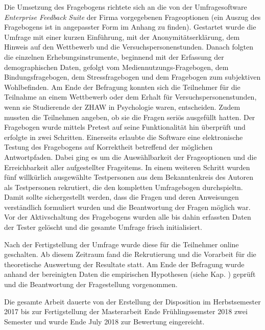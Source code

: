 Die Umsetzung des Fragebogens richtete sich an die von der Umfragesoftware \textit{Enterprise Feedback Suite} der Firma  vorgegebenen Frageoptionen (ein Auszug des Fragebogens ist in angepasster Form im Anhang  zu finden). Gestartet wurde die Umfrage mit einer kurzen Einführung, mit der Anonymitätserklärung, dem Hinweis auf den Wettbewerb und die Versuchspersonenstunden. Danach folgten die einzelnen Erhebungsinstrumente, beginnend mit der Erfassung der demographischen Daten, gefolgt vom Mediennutzungs-Fragebogen, dem Bindungsfragebogen, dem Stressfragebogen und dem Fragebogen zum subjektiven Wohlbefinden. Am Ende der Befragung konnten sich die Teilnehmer für die Teilnahme an einem Wettbewerb oder dem Erhalt für Versuchspersonenstunden, wenn sie Studierende der ZHAW in Psychologie waren, entscheiden. Zudem mussten die Teilnehmen angeben, ob sie die Fragen seriös ausgefüllt hatten. Der Fragebogen wurde mittels Pretest auf seine Funktionalität hin überprüft und erfolgte in zwei Schritten. Einerseits erlaubte die Software eine elektronische Testung des Fragebogens auf Korrektheit betreffend der möglichen Antwortpfaden. Dabei ging es um die Auswählbarkeit der Frageoptionen und die Erreichbarkeit aller aufgestellter Frageitems. In einem weiteren Schritt wurden fünf willkürlich ausgewählte Testpersonen aus dem Bekanntenkreis des Autoren als Testpersonen rekrutiert, die den kompletten Umfragebogen durchspieltn. Damit sollte sichergestellt werden, dass die Fragen und deren Anweisungen verständlich formuliert wurden und die Beantwortung der Fragen möglich war. Vor der Aktivschaltung des Fragebogens wurden alle bis dahin erfassten Daten der Tester gelöscht und die gesamte Umfrage frisch initialisiert.

Nach der Fertigstellung der Umfrage wurde diese für die Teilnehmer online geschalten. Ab diesem Zeitraum fand die Rekrutierung und die Vorarbeit für die theoretische Auswertung der Resultate statt. Am Ende der Befragung wurde anhand der bereinigten Daten die empirischen Hypothesen (siehe Kap. ) geprüft und die Beantwortung der Fragestellung vorgenommen.

Die gesamte Arbeit dauerte von der Erstellung der Disposition im Herbstsemester 2017 bis zur Fertigstellung der Masterarbeit Ende Frühlingssemster 2018 zwei Semester und wurde Ende July 2018 zur Bewertung eingereicht.

